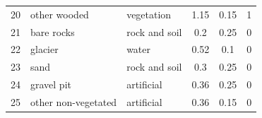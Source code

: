 \documentclass[12pt]{iopart}
\begin{document}
\begin{table}[!h]
\begin{center}
\begin{tabular}{ c p{} p{} c c c }
        20 & other wooded & vegetation & 1.15 & 0.15 & 1\\
        21 & bare rocks & rock and soil & 0.2 & 0.25 & 0 \\
        22 & glacier & water & 0.52 & 0.1 & 0 \\
        23 & sand & rock and soil & 0.3 & 0.25 & 0 \\
        24 & gravel pit & artificial & 0.36 & 0.25 & 0 \\
        25 & other non-vegetated & artificial & 0.36 & 0.15 & 0 \\
        \bottomrule
      \end{tabular}
    \end{center}
\end{table}
\end{document}
